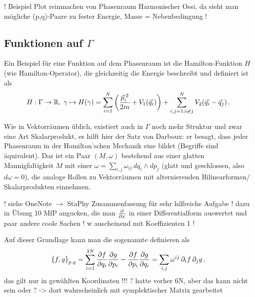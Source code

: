 \documentclass[../class_mech_main.tex]{subfiles}
\begin{document}
! Beispiel Plot reinmachen von Phasenraum Harmonischer Ossi, da sieht man mögliche (p,q)-Paare zu fester Energie, Masse = Nebenbedingung !



	\subsection{Funktionen auf $\Gamma$}
Ein Beispiel für eine Funktion auf dem Phasenraum ist die Hamilton-Funktion $H$ (wie Hamilton-Operator), die gleichzeitig die Energie beschreibt und definiert ist als
\begin{align}
H: \Gamma \rightarrow \mathbb{R}, \; \gamma \mapsto H(\gamma) = \sum\limits_{i = 1}^N \qty(\frac{\vec{p}^{\;2}_i}{2m} + V_1(\vec{q}_i)) + \sum\limits_{i,j = 1; i \neq j}^N V_2(\vec{q}_i - \vec{q}_j) \, .
\end{align}




Wie in Vektorräumen üblich, existiert auch in $\Gamma$ noch mehr Struktur und zwar eine Art Skalarprodukt, es hilft hier der Satz von Darboux: er besagt, dass jeder Phasenraum in der Hamilton'schen Mechanik eine  bildet (Begriffe sind äquivalent). Das ist ein Paar $(M, \omega)$ bestehend aus einer glatten Mannigfaltigkeit $M$ mit einer  $\omega = \sum\limits_{i,j} \omega_{ij} \, dq_i \wedge dp_j$ (glatt und geschlossen, also $d\omega = 0$), die analoge Rollen zu Vektorräumen mit alternierenden Bilinearformen/ Skalarprodukten einnehmen.

! siehe OneNote $\rightarrow$ StaPhy Zusammenfassung für sehr hilfreiche Aufgabe ! dazu in Übung 10 MfP angucken, die man $\pdv{x}$ in einer Differentialform auswertet und paar andere coole Sachen ! w anscheinend mit Koeffizienten 1 !

Auf dieser Grundlage kann man die sogenannte  definieren als
\begin{equation}
\qty{f,g}_{p,q} = \sum\limits_{i = 1}^{3N} \pdv{f}{q_i} \pdv{g}{p_i} - \pdv{f}{p_i} \pdv{g}{q_i} = \sum\limits_{i,j} \omega^{ij} \, \partial_i f \, \partial_j g \, ,
\end{equation}
das gilt nur in gewählten Koordinaten !!! ? hatte vorher 6N, aber das kann nicht sein oder ? -> dort wahrscheinlich mit symplektischer Matrix gearbeitet
\end{document}
